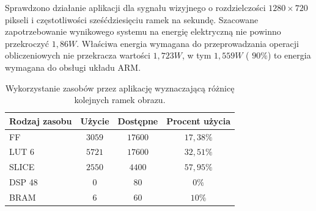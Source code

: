 Sprawdzono działanie aplikacji dla sygnału wizyjnego o rozdzielczości $1280 \times 720$ pikseli i częstotliwości sześćdziesięciu ramek na sekundę.
Szacowane zapotrzebowanie wynikowego systemu na energię elektryczną nie powinno przekroczyć $1,86W$. Właściwa energia wymagana do przeprowadzania operacji obliczeniowych nie przekracza wartości $1,723W$, w tym $1,559W$ ( $90\%$) to energia wymagana do obsługi układu ARM.

\begin{table}[h]
	\caption{Wykorzystanie zasobów przez aplikację wyznaczającą różnicę kolejnych ramek obrazu.} 
	\centering
	\label{tab;frame-difference-utilization}
	\begin{tabular}{|l|c|c|c|}
		\hline
		\textbf{Rodzaj zasobu} & \textbf{Użycie} & \textbf{Dostępne} & \textbf{Procent użycia}      \\ \hline
		FF                     & $3059$            & $17600$             & $17,38\%$                 \\ \hline
		LUT 6                  & $5721$            & $17600$             & $32,51\%$                 \\ \hline
		SLICE                  & $2550$            & $4400$             & $57,95\%$                 \\ \hline
		DSP 48                 & $0$               & $80$                & $0\%$                    \\ \hline
		BRAM                   & $6$               & $60$                & $10\%$                   \\ \hline
	\end{tabular}
\end{table}

